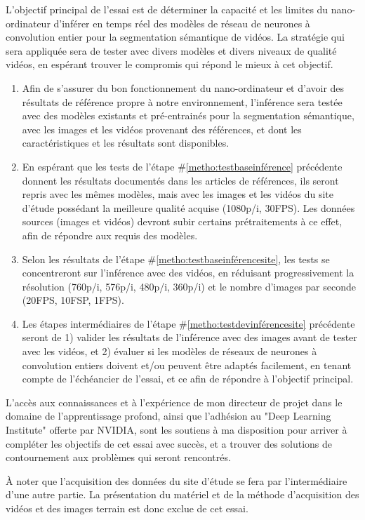 \par L'objectif principal de l'essai est de déterminer la capacité et les limites du nano-ordinateur d'inférer en temps réel des modèles de réseau de neurones à convolution entier pour la segmentation sémantique de vidéos. La stratégie qui sera appliquée sera de tester avec divers modèles et divers niveaux de qualité vidéos, en espérant trouver le compromis qui répond le mieux à cet objectif.
\begin{enumerate}
   \item \label{metho:testbaseinférence} Afin de s'assurer du bon fonctionnement du nano-ordinateur et d'avoir des résultats de référence propre à notre environnement, l'inférence sera testée avec des modèles existants et pré-entrainés pour la segmentation sémantique, avec les images et les vidéos provenant des références, et dont les caractéristiques et les résultats sont disponibles. 
   \item \label{metho:testbaseinférencesite} En espérant que les tests de l'étape \#\ref{metho:testbaseinférence} précédente donnent les résultats documentés dans les articles de références, ils seront repris avec les mêmes modèles, mais avec les images et les vidéos du site d'étude possédant la meilleure qualité acquise (1080p/i, 30FPS). Les données sources (images et vidéos) devront subir certains prétraitements à ce effet, afin de répondre aux requis des modèles.
   \item \label{metho:testdevinférencesite} Selon les résultats de l'étape \#\ref{metho:testbaseinférencesite}, les tests se concentreront sur l'inférence avec des vidéos, en réduisant progressivement la résolution (760p/i, 576p/i, 480p/i, 360p/i) et le nombre d'images par seconde (20FPS, 10FSP, 1FPS).
   \item Les étapes intermédiaires de l'étape \#\ref{metho:testdevinférencesite} précédente seront de 1) valider les résultats de l'inférence avec des images avant de tester avec les vidéos, et 2) évaluer si les modèles de réseaux de neurones à convolution entiers doivent et/ou peuvent être adaptés facilement, en tenant compte de l'échéancier de l'essai, et ce afin de répondre à l'objectif principal.
\end{enumerate}
\par L'accès aux connaissances et à l'expérience de mon directeur de projet dans le domaine de l'apprentissage profond, ainsi que l'adhésion au "Deep Learning Institute" offerte par NVIDIA, sont les soutiens à ma disposition  pour arriver à compléter les objectifs de cet essai avec succès, et a trouver des solutions de contournement aux problèmes qui seront rencontrés.
\par À noter que l'acquisition des données du site d'étude se fera par l'intermédiaire d'une autre partie. La présentation du matériel et de la méthode d'acquisition des vidéos et des images terrain est donc exclue de cet essai.

\vspace{1\baselineskip}
\par 